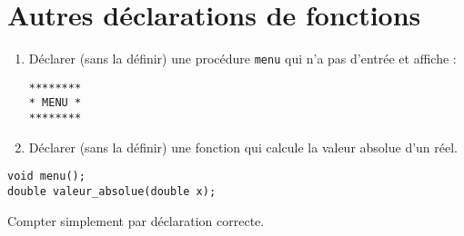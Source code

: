 \section{Autres déclarations de fonctions}
\begin{enumerate}
\item Déclarer (sans la définir) une procédure \verb|menu| qui n'a pas d'entrée et
  affiche :\label{item:menu}
\begin{small}
\begin{verbatim}
********
* MENU *
********
\end{verbatim}
\end{small}
\item Déclarer (sans la définir) une fonction qui calcule la valeur absolue d'un réel.\label{valeurabsolue}
\end{enumerate}

\begin{correction}
\begin{verbatim}
void menu();
double valeur_absolue(double x);
\end{verbatim}
  \begin{baremeenv}
    Compter simplement  par déclaration correcte.
  \end{baremeenv}
\end{correction}

